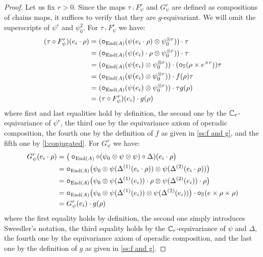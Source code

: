 \begin{proof}
	Let us fix $r>0$.
	Since the maps $\tau \comp F^r_\psi$ and $G^r_\psi$ are defined as compositions of chains maps, it suffices to verify that they are $g$-equivariant.
	We will omit the superscripts of $\psi^r$ and $\psi_0^2$.
	For $\tau \comp F^r_\psi$ we have:
	\begin{align*}
		(\tau \mathbin{\circ} F^r_\psi)(e_i \cdot \rho) &=
		(\bm{\mathbin{\circ}}_{\mathrm{End}(A)}(\psi(e_i \cdot \rho) \otimes \psi_0^{\otimes r})) \cdot \tau \\ &=
		(\bm{\mathbin{\circ}}_{\mathrm{End}(A)}(\psi(e_i) \cdot \rho \otimes \psi_0^{\otimes r})) \cdot \tau \\ &=
		(\bm{\mathbin{\circ}}_{\mathrm{End}(A)}(\psi(e_i) \otimes \psi_0^{\otimes r})) \cdot (\bm{\mathbin{\circ}}_{\mathbb{S}} (\rho \times e^{\times r}))\tau \\ &=
		(\bm{\mathbin{\circ}}_{\mathrm{End}(A)}(\psi(e_i) \otimes \psi_0^{\otimes r})) \cdot f(\rho)\tau \\ &=
		(\bm{\mathbin{\circ}}_{\mathrm{End}(A)}(\psi(e_i) \otimes \psi_0^{\otimes r})) \cdot \tau g(\rho) \\ &=
		(\tau \mathbin{\circ} F^r_\psi)(e_i) \cdot g(\rho)
	\end{align*}
	where first and last equalities hold by definition, the second one by the $\mathbb{C}_r$-equivariance of $\psi^r$, the third one by the equivariance axiom of operadic composition, the fourth one by the definition of $f$ as given in \cref{ss:f and g}, and the fifth one by \cref{l:conjugated}.
	For $G^r_\psi$ we have:
	\begin{align*}
		G^r_\psi(e_i \cdot \rho) &=
		\big(\bm{\mathbin{\circ}}_{\mathrm{End}(A)} \mathbin{\circ} (\psi_0 \otimes \psi \otimes \psi) \mathbin{\circ} \Delta)(e_i \cdot \rho \big) \\ &=
		\bm{\mathbin{\circ}}_{\mathrm{End}(A)} \big(\psi_0 \otimes \psi(\Delta^{(1)}(e_i \cdot \rho)) \otimes \psi(\Delta^{(2)}(e_i \cdot \rho)) \big) \\ &=
		\bm{\mathbin{\circ}}_{\mathrm{End}(A)} \big(\psi_0 \otimes \psi(\Delta^{(1)}(e_i)) \cdot \rho \otimes \psi(\Delta^{(2)}(e_i)) \cdot \rho \big) \\ &=
		\bm{\mathbin{\circ}}_{\mathrm{End}(A)} \big(\psi_0 \otimes \psi(\Delta^{(1)}(e_i)) \otimes \psi(\Delta^{(2)}(e_i)) \big) \cdot \bm{\mathbin{\circ}}_{\mathbb{S}}(e \times \rho \times \rho) \\ &=
		G^r_\psi(e_i) \cdot g(\rho)
	\end{align*}
	where the first equality holds by definition, the second one simply introduces Sweedler's notation, the third equality holds by the $\mathbb{C}_r$-equivariance of $\psi$ and $\Delta$, the fourth one by the equivariance axiom of operadic composition, and the last one by the definition of $g$ as given in \cref{ss:f and g}.
\end{proof}


